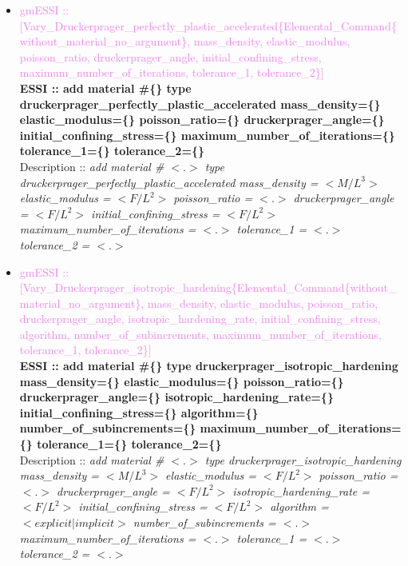 \documentclass[11pt]{article}
\begin{document}
\begin{itemize}
    \item \textcolor{violet}{gmESSI :: [Vary\_Druckerprager\_perfectly\_plastic\_accelerated\{Elemental\_Command\{without\_material\_no\_argument\}, mass\_density, elastic\_modulus, poisson\_ratio, druckerprager\_angle, initial\_confining\_stress, maximum\_number\_of\_iterations, tolerance\_1, tolerance\_2\}]}\\
    \textbf{ESSI :: add material \#\{\} type druckerprager\_perfectly\_plastic\_accelerated  mass\_density=\{\} elastic\_modulus=\{\}  poisson\_ratio=\{\} druckerprager\_angle=\{\} initial\_confining\_stress=\{\} maximum\_number\_of\_iterations=\{\} tolerance\_1=\{\} tolerance\_2=\{\}}\\
    Description ::  \textit{ add material \# $<.>$ type druckerprager\_perfectly\_plastic\_accelerated  mass\_density = $<M/L^3>$ elastic\_modulus = $<F/L^2>$  poisson\_ratio = $<.>$ druckerprager\_angle = $<F/L^2>$ initial\_confining\_stress = $<F/L^2>$ maximum\_number\_of\_iterations = $<.>$ tolerance\_1 = $<.>$ tolerance\_2 = $<.>$} 

    \item \textcolor{violet}{gmESSI :: [Vary\_Druckerprager\_isotropic\_hardening\{Elemental\_Command\{without\_material\_no\_argument\}, mass\_density, elastic\_modulus, poisson\_ratio, druckerprager\_angle, isotropic\_hardening\_rate, initial\_confining\_stress, algorithm, number\_of\_subincrements, maximum\_number\_of\_iterations, tolerance\_1, tolerance\_2\}]}\\
    \textbf{ESSI :: add material \#\{\} type druckerprager\_isotropic\_hardening mass\_density=\{\} elastic\_modulus=\{\}  poisson\_ratio=\{\} druckerprager\_angle=\{\} isotropic\_hardening\_rate=\{\} initial\_confining\_stress=\{\} algorithm=\{\}  number\_of\_subincrements=\{\} maximum\_number\_of\_iterations=\{\} tolerance\_1=\{\} tolerance\_2=\{\}}\\
    Description ::  \textit{ add material \# $<.>$ type druckerprager\_isotropic\_hardening mass\_density = $<M/L^3>$ elastic\_modulus = $<F/L^2>$  poisson\_ratio = $<.>$ druckerprager\_angle = $<F/L^2>$ isotropic\_hardening\_rate = $<F/L^2>$ initial\_confining\_stress = $<F/L^2>$ algorithm = $<explicit|implicit>$  number\_of\_subincrements = $<.>$ maximum\_number\_of\_iterations = $<.>$ tolerance\_1 = $<.>$ tolerance\_2 = $<.>$} 


\end{itemize}
\end{document}
